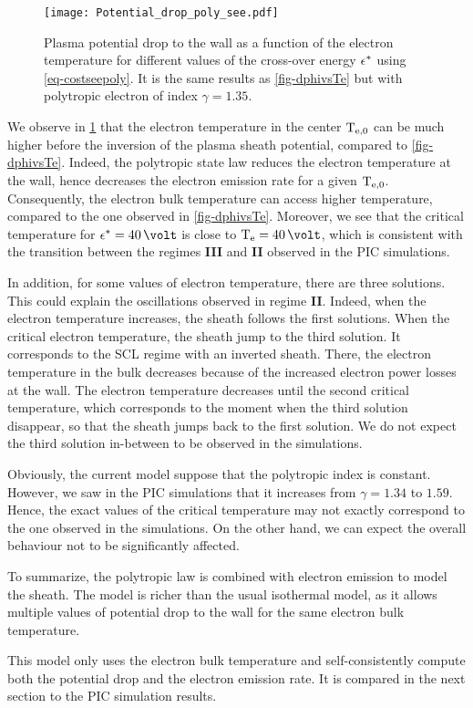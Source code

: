 \begin{figure}[hbtp]
  \centering
  \texttt{[image: Potential\_drop\_poly\_see.pdf]}
  \caption{ Plasma potential drop to the wall as a function of the electron temperature for different values of the cross-over energy $\epsilon^{*}$ using \cref{eq-costseepoly}. It is the same results as  \cref{fig-dphivsTe} but with polytropic electron of index $\gamma=1.35$.}
  \label{fig-rso_crit_see}
\end{figure}

We observe in \cref{fig-rso_crit_see} that the electron temperature in the center $\mathrm{T_{e, 0}}$ can be much higher before the inversion of the plasma sheath potential, compared to \cref{fig-dphivsTe}.
Indeed, the polytropic state law reduces the electron temperature at the wall, hence decreases the electron emission rate for a given $\mathrm{T_{e, 0}}$.
Consequently, the electron bulk temperature can access higher temperature, compared to the one observed in \cref{fig-dphivsTe}.
Moreover, we see that the critical temperature for $\crover=40 \,\volt$ is close to $\Te=40\,\volt$, which is consistent with the transition between the regimes {\bf III} and {\bf II} observed in the \ac{PIC} simulations.

In addition, for some values of electron temperature, there are three solutions.
This could explain the oscillations observed in regime {\bf II}.
Indeed, when the electron temperature increases, the sheath follows the first solutions.
When the critical electron temperature, the sheath jump to the third solution.
It corresponds to the \ac{SCL} regime with an inverted sheath.
There, the electron temperature in the bulk decreases because of the increased electron power losses at the wall.
The electron temperature decreases until the second critical temperature, which corresponds to the moment when the third solution disappear, so that the sheath jumps back to the first solution.
We do not expect the third solution in-between to be observed in the simulations.

Obviously, the current model suppose that the polytropic index is constant.
However, we saw in the \ac{PIC} simulations that it increases from $\gamma = 1.34$ to $1.59$.
Hence, the exact values of the critical temperature may not exactly correspond to the one observed in the simulations.
On the other hand, we can expect the overall behaviour not to be significantly affected.

\vspace{1em}
To summarize, the polytropic law is combined with electron emission to model the sheath.
The model is richer than the usual isothermal model, as it allows multiple values of potential drop to the wall for the same electron bulk temperature.

This model only uses the electron bulk temperature and self-consistently compute both the potential drop and the electron emission rate.
It is compared in the next section to the \ac{PIC} simulation results.
